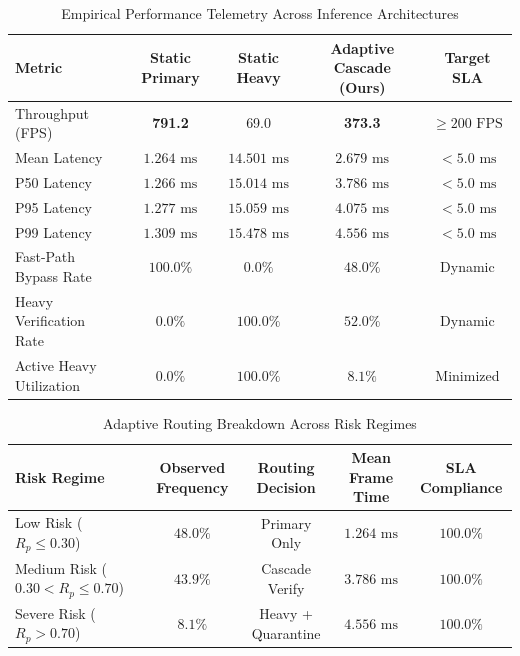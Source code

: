 \documentclass[conference]{IEEEtran}
\begin{document}
\begin{table}[t]
\centering
\caption{Empirical Performance Telemetry Across Inference Architectures}
\label{tab:cascade_results}
\begin{tabular}{@{}lcccc@{}}
\toprule
\textbf{Metric} & \textbf{Static Primary} & \textbf{Static Heavy} & \textbf{Adaptive Cascade (Ours)} & \textbf{Target SLA} \\ \midrule
Throughput (FPS) & \textbf{791.2} & 69.0 & \textbf{373.3} & $\ge 200\text{ FPS}$ \\
Mean Latency & \textbf{$1.264\text{ ms}$} & $14.501\text{ ms}$ & \textbf{$2.679\text{ ms}$} & $<5.0\text{ ms}$ \\
P50 Latency & $1.266\text{ ms}$ & $15.014\text{ ms}$ & \textbf{$3.786\text{ ms}$} & $<5.0\text{ ms}$ \\
P95 Latency & $1.277\text{ ms}$ & $15.059\text{ ms}$ & \textbf{$4.075\text{ ms}$} & $<5.0\text{ ms}$ \\
P99 Latency & $1.309\text{ ms}$ & $15.478\text{ ms}$ & \textbf{$4.556\text{ ms}$} & $<5.0\text{ ms}$ \\
Fast-Path Bypass Rate & $100.0\%$ & $0.0\%$ & \textbf{$48.0\%$} & Dynamic \\
Heavy Verification Rate & $0.0\%$ & $100.0\%$ & \textbf{$52.0\%$} & Dynamic \\
Active Heavy Utilization & $0.0\%$ & $100.0\%$ & \textbf{$8.1\%$} & Minimized \\ \bottomrule
\end{tabular}
\end{table}

\begin{table}[t]
\centering
\caption{Adaptive Routing Breakdown Across Risk Regimes}
\label{tab:cascade_breakdown}
\begin{tabular}{@{}lcccc@{}}
\toprule
\textbf{Risk Regime} & \textbf{Observed Frequency} & \textbf{Routing Decision} & \textbf{Mean Frame Time} & \textbf{SLA Compliance} \\ \midrule
Low Risk ($R_p \le 0.30$) & $48.0\%$ & Primary Only & $1.264\text{ ms}$ & $100.0\%$ \\
Medium Risk ($0.30 < R_p \le 0.70$) & $43.9\%$ & Cascade Verify & $3.786\text{ ms}$ & $100.0\%$ \\
Severe Risk ($R_p > 0.70$) & $8.1\%$ & Heavy + Quarantine & $4.556\text{ ms}$ & $100.0\%$ \\ \bottomrule
\end{tabular}
\end{table}
\end{document}
